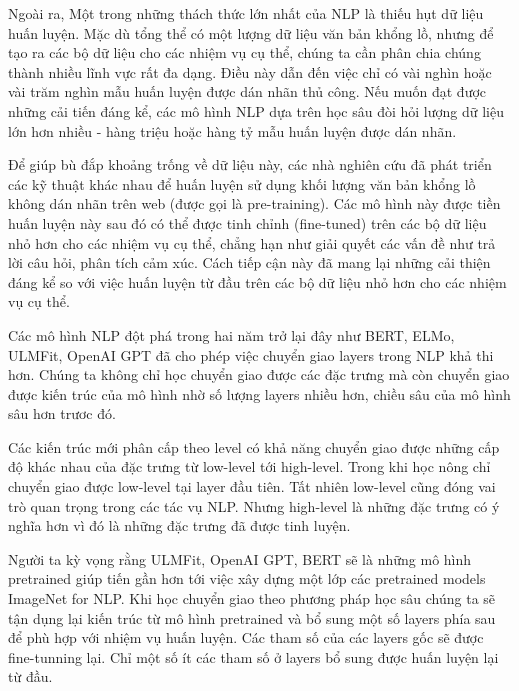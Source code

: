 Ngoài ra, Một trong những thách thức lớn nhất của NLP là thiếu hụt dữ liệu huấn luyện. Mặc dù tổng thể có một lượng dữ liệu văn bản khổng lồ, nhưng để tạo ra các bộ dữ liệu cho các nhiệm vụ cụ thể, chúng ta cần phân chia chúng thành nhiều lĩnh vực rất đa dạng. Điều này dẫn đến việc chỉ có vài nghìn hoặc vài trăm nghìn mẫu huấn luyện được dán nhãn thủ công. Nếu muốn đạt được những cải tiến đáng kể, các mô hình NLP dựa trên học sâu đòi hỏi lượng dữ liệu lớn hơn nhiều - hàng triệu hoặc hàng tỷ mẫu huấn luyện được dán nhãn.

Để giúp bù đắp khoảng trống về dữ liệu này, các nhà nghiên cứu đã phát triển các kỹ thuật khác nhau để huấn luyện sử dụng khối lượng văn bản khổng lồ không dán nhãn trên web (được gọi là pre-training). Các mô hình này được tiền huấn luyện này sau đó có thể được tinh chỉnh (fine-tuned) trên các bộ dữ liệu nhỏ hơn cho các nhiệm vụ cụ thể, chẳng hạn như giải quyết các vấn đề như trả lời câu hỏi, phân tích cảm xúc. Cách tiếp cận này đã mang lại những cải thiện đáng kể so với việc huấn luyện từ đầu trên các bộ dữ liệu nhỏ hơn cho các nhiệm vụ cụ thể. 

Các mô hình NLP đột phá trong hai năm trở lại đây như BERT, ELMo, ULMFit, OpenAI GPT đã cho phép việc chuyển giao layers trong NLP khả thi hơn. Chúng ta không chỉ học chuyển giao được các đặc trưng mà còn chuyển giao được kiến trúc của mô hình nhờ số lượng layers nhiều hơn, chiều sâu của mô hình sâu hơn trươc đó.

Các kiến trúc mới phân cấp theo level có khả năng chuyển giao được những cấp độ khác nhau của đặc trưng từ low-level tới high-level. Trong khi học nông chỉ chuyển giao được low-level tại layer đầu tiên. Tất nhiên low-level cũng đóng vai trò quan trọng trong các tác vụ NLP. Nhưng high-level là những đặc trưng có ý nghĩa hơn vì đó là những đặc trưng đã được tinh luyện.

Người ta kỳ vọng rằng ULMFit, OpenAI GPT, BERT sẽ là những mô hình pretrained giúp tiến gần hơn tới việc xây dựng một lớp các pretrained models ImageNet for NLP. Khi học chuyển giao theo phương pháp học sâu chúng ta sẽ tận dụng lại kiến trúc từ mô hình pretrained và bổ sung một số layers phía sau để phù hợp với nhiệm vụ huấn luyện. Các tham số của các layers gốc sẽ được fine-tunning lại. Chỉ một số ít các tham số ở layers bổ sung được huấn luyện lại từ đầu.
